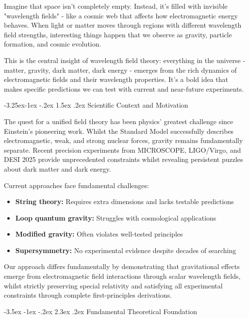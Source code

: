 \documentclass[10pt,twocolumn]{article}
\makeatletter
\renewcommand\section{\@startsection{section}{1}{\z@}%
  {-3.5ex \@plus -1ex \@minus -.2ex}%
  {2.3ex \@plus.2ex}%
  {\normalfont\large\bfseries}}
\renewcommand\subsection{\@startsection{subsection}{2}{\z@}%
  {-3.25ex\@plus -1ex \@minus -.2ex}%
  {1.5ex \@plus .2ex}%
  {\normalfont\normalsize\bfseries}}
\makeatother
\begin{document}
Imagine that space isn't completely empty. Instead, it's filled with invisible "wavelength fields" - like a cosmic web that affects how electromagnetic energy behaves. When light or matter moves through regions with different wavelength field strengths, interesting things happen that we observe as gravity, particle formation, and cosmic evolution.

This is the central insight of wavelength field theory: everything in the universe - matter, gravity, dark matter, dark energy - emerges from the rich dynamics of electromagnetic fields and their wavelength properties. It's a bold idea that makes specific predictions we can test with current and near-future experiments.

\vspace{0.5em}
\subsection{Scientific Context and Motivation}

The quest for a unified field theory has been physics' greatest challenge since Einstein's pioneering work. Whilst the Standard Model successfully describes electromagnetic, weak, and strong nuclear forces, gravity remains fundamentally separate. Recent precision experiments from MICROSCOPE, LIGO/Virgo, and DESI 2025 provide unprecedented constraints whilst revealing persistent puzzles about dark matter and dark energy.

Current approaches face fundamental challenges:

\begin{itemize}
\item \textbf{String theory:} Requires extra dimensions and lacks testable predictions
\item \textbf{Loop quantum gravity:} Struggles with cosmological applications
\item \textbf{Modified gravity:} Often violates well-tested principles
\item \textbf{Supersymmetry:} No experimental evidence despite decades of searching
\end{itemize}

Our approach differs fundamentally by demonstrating that gravitational effects emerge from electromagnetic field interactions through scalar wavelength fields, whilst strictly preserving special relativity and satisfying all experimental constraints through complete first-principles derivations.

\section{Fundamental Theoretical Foundation}
\end{document}
